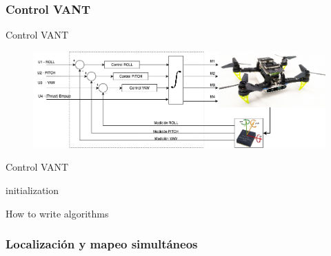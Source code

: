\documentclass[
  24pt, %
  aspectratio=169, %
]{beamer}
\begin{document}
\subsubsection{Control VANT}
\begin{frame}{Control VANT}
  \begin{figure}
    \centering
    \includegraphics[width=14cm]{drone_control}
  \end{figure}
\end{frame}

\begin{frame}{Control VANT}
  \begin{algorithm}[H]
    initialization\;
    \caption{How to write algorithms}
  \end{algorithm}
\end{frame}

\subsubsection{Localización y mapeo simultáneos}
\end{document}
